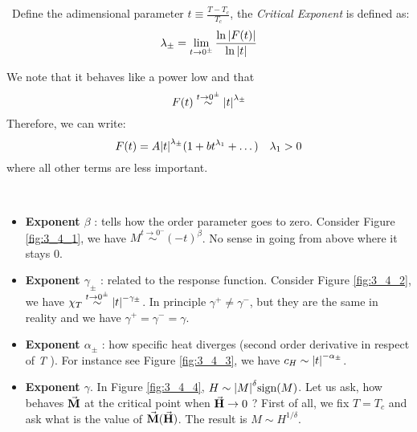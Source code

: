 \documentclass[../main/main.tex]{subfiles}
\begin{document}
\begin{bluebox}
\begin{definition} \
Define the adimensional parameter \( t \equiv \frac{T-T_c}{T_c} \), the \emph{Critical Exponent} is defined as:
\begin{equation}
  \lambda _{\pm} = \lim_{t \rightarrow 0^{\pm}} \frac{\ln{\abs{F(t)} } }{\ln{\abs{t} } }
  \label{eq:}
\end{equation}
\end{definition}
\end{bluebox}
We note that it behaves like a power low and that
\begin{equation}
  F(t) \overset{t \rightarrow  0^{\pm}}{\sim } \abs{t}^{\lambda _{\pm}}
  \label{eq:}
\end{equation}
Therefore, we can write:
\begin{equation}
  F(t) = A \abs{t}^{\lambda _{\pm}} ( 1 + bt^{\lambda _1}+ \dots) \quad \lambda _1 > 0
  \label{eq:}
\end{equation}
where all other terms are less important.
\begin{bluebox}
\begin{definition}[Exponent]\
\begin{itemize}
\item \textbf{Exponent \( \beta \) }: tells how the order parameter goes to zero.
Consider Figure \ref{fig:3_4_1}, we have \( M \overset{t \rightarrow  0^-}{\sim} (-t)^{\beta }  \). No sense in going from above where it stays 0.

\item \textbf{Exponent \( \gamma _{\pm}  \) }: related to the response function. Consider Figure \ref{fig:3_4_2}, we have \( \chi _T \overset{t \rightarrow 0^{\pm}}{\sim} \abs{t}^{-\gamma _{\pm} }   \). In principle \( \gamma ^+ \neq \gamma ^-  \), but they are the same in reality and we have \( \gamma ^+ = \gamma ^- = \gamma     \).

\item \textbf{Exponent \( \alpha _{\pm} \) }: how specific heat diverges (second order derivative in respect of \emph{T} ). For instance see Figure \ref{fig:3_4_3}, we have \( c_H \sim \abs{t}^{-\alpha _{\pm}}  \).

\item \textbf{Exponent \( \gamma   \)}. In Figure \ref{fig:3_4_4}, \( H \sim \abs{M}^{\delta } \text{sign} (M)  \). Let us ask, how behaves \( \va{M}  \) at the critical point when \( \va{H} \rightarrow 0  \) ?
First of all, we fix \( T=T_c \) and ask what is the value of \( \va{M}(\va{H} ) \). The result is \( M \sim H^{1/\delta } \).
\end{itemize}
\end{definition}
\end{bluebox}
\end{document}
